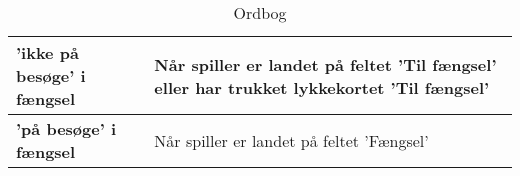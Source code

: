 \documentclass[class=article, crop=false]{standalone}
\begin{document}
    \begin{table}[H]
        \caption{Ordbog}
        \begin{tabularx}{\textwidth}{|l|X|}
            \hline
            \textbf{'ikke på besøge' i fængsel}& Når spiller er landet på feltet
                                            'Til fængsel' eller har trukket
                                             lykkekortet 'Til fængsel' \\ \hline
            \textbf{'på besøge' i fængsel}   & Når spiller er landet på feltet 'Fængsel'\\ \hline

        \end{tabularx}


    \end{table}
\end{document}
